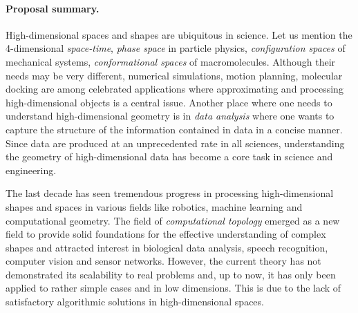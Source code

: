 \documentclass[a4paper, 11pt]{article}
\begin{document}
\paragraph{Proposal summary.} High-dimensional spaces and shapes
are ubiquitous in science.  Let us mention the  4-dimensional {\em space-time},  {\em phase space} in particle physics, {\em configuration spaces} of mechanical systems, {\em conformational spaces} of macromolecules.  Although their needs may be very different, numerical simulations, motion planning, molecular docking are among celebrated applications where approximating and processing high-dimensional objects is a central issue. 
Another place where one needs to understand
high-dimensional geometry is in {\em data analysis} where one wants to
capture the structure of the information contained in data in a
concise manner.  %
Since data are produced at an unprecedented rate in all
sciences, understanding the geometry of high-dimensional data %
has become a core task in science and engineering.

The last decade has seen tremendous progress in processing high-dimensional shapes and spaces in various fields like robotics, machine learning and computational geometry.
The field of {\em computational topology} emerged as a new field to provide solid foundations for the effective understanding of complex shapes
%
%
and %
attracted  interest in biological data analysis, speech recognition, computer vision and sensor networks.
However, the current theory has not demonstrated its scalability to
real problems and, up to now, it has only been applied to rather
simple cases and in low dimensions. This is  due to the lack of
satisfactory algorithmic solutions in high-dimensional spaces.
\end{document}
